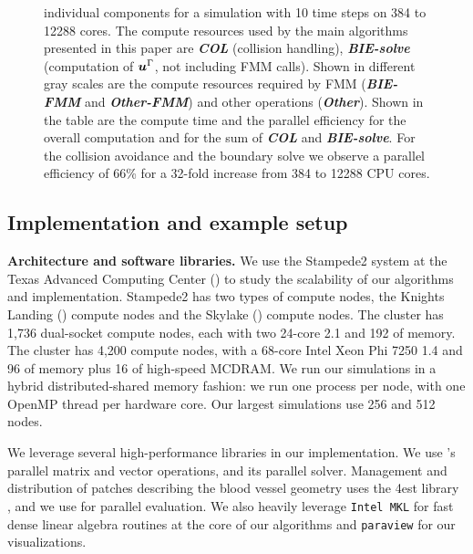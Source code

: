 \begin{figure}[!th]
{  individual components for a simulation with 10 time
  steps on 384 to 12288 cores. The compute resources used by the main algorithms presented in this
  paper are {\bf\em COL} (collision handling), {\bf\em BIE-solve}
  (computation of ${\bm{u}}^{\Gamma}$, not including FMM calls). Shown in different gray scales are the
  compute resources required by FMM ({\bf\em BIE-FMM} and {\bf\em
    Other-FMM}) and other operations ({\bf\em Other}). Shown in the table
  are the compute time and the parallel efficiency for the
  overall computation and for the sum of {\bf\em COL} and {\bf\em
    BIE-solve}. For the collision avoidance and the
  boundary solve we observe a parallel efficiency of $66$\% for a
  32-fold increase from 384 to 12288 CPU cores.
}
\end{figure}
\subsection{Implementation and example setup}\label{ss:implementation}

\textbf{Architecture and software libraries. } We use the Stampede2 system at the Texas Advanced Computing Center ()
to study the scalability of our algorithms and implementation.
Stampede2 has two types of compute nodes, the Knights Landing () compute nodes
and the Skylake () compute nodes.
The  cluster has 1,736 dual-socket compute nodes, each with two
24-core 2.1  and 192 of memory.
The  cluster has 4,200 compute nodes, with a 68-core Intel Xeon Phi
7250 1.4  and 96 of memory plus 16 of
high-speed MCDRAM.
We run our simulations in a hybrid distributed-shared memory fashion: we run one
 process per node, with one OpenMP thread per hardware core.
Our largest simulations use 256  and 512  nodes.

We leverage several high-performance libraries in our implementation.
We use 's \cite{balay2017petsc} parallel matrix and vector operations, and its
parallel \gmres solver. 
Management and distribution of patches describing the blood vessel
geometry uses the \p4est library \cite{BursteddeWilcoxGhattas11}, and
we use \pvfmm
\cite{malhotra2015} for parallel \fmm evaluation.
We also heavily leverage \texttt{Intel MKL} for fast dense linear algebra
routines at the core of our algorithms and \texttt{paraview} for our
visualizations.

